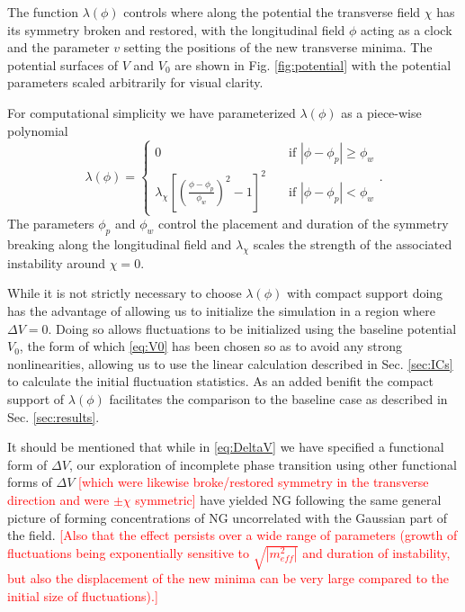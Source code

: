 The function $\lambda(\phi)$ controls where along the potential the transverse field $\chi$ has its symmetry broken and restored, with the longitudinal field $\phi$ acting as a clock and the parameter $v$ setting the positions of the new transverse minima. The potential surfaces of $V$ and $V_0$ are shown in Fig. \ref{fig:potential} with the potential parameters scaled arbitrarily for visual clarity.

For computational simplicity we have parameterized $\lambda(\phi)$ as a piece-wise polynomial
\begin{equation} \label{eq:lambda}
  \lambda(\phi) =
  \begin{cases}
    0 & \quad \text{if } |\phi-\phi_p|\ge\phi_w \\
    \lambda_\chi\left[\left(\frac{\phi-\phi_p}{\phi_w}\right)^2 - 1 \right]^2 & \quad \text{if  } |\phi-\phi_p|<\phi_w
  \end{cases}.
\end{equation}
The parameters $\phi_p$ and $\phi_w$ control the placement and duration of the symmetry breaking along the longitudinal field and $\lambda_\chi$ scales the strength of the associated instability around $\chi=0$.

While it is not strictly necessary to choose $\lambda(\phi)$ with compact support doing has the advantage of allowing us to initialize the simulation in a region where $\Delta V=0$. Doing so allows fluctuations to be initialized using the baseline potential $V_0$, the form of which \eqref{eq:V0} has been chosen so as to avoid any strong nonlinearities, allowing us to use the linear calculation described in Sec. \ref{sec:ICs} to calculate the initial fluctuation statistics. As an added benifit the compact support of $\lambda(\phi)$ facilitates the comparison to the baseline case as described in Sec. \ref{sec:results}.

It should be mentioned that while in \eqref{eq:DeltaV} we have specified a functional form of $\Delta V$, our exploration of incomplete phase transition using other functional forms of $\Delta V$ \textcolor{red}{[which were likewise broke/restored symmetry in the transverse direction and were $\pm\chi$ symmetric]} have yielded NG following the same general picture of forming concentrations of NG uncorrelated with the Gaussian part of the field. \textcolor{red}{[Also that the effect persists over a wide range of parameters (growth of fluctuations being exponentially sensitive to $\sqrt{|m^2_{eff}|}$ and duration of instability, but also the displacement of the new minima can be very large compared to the initial size of fluctuations).]}

